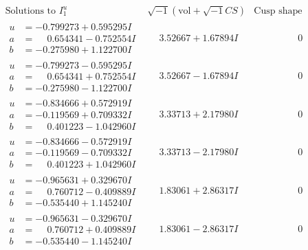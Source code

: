\documentclass[1p]{elsarticle_modified}
\theoremstyle{definition}
\newcommand{\I}{\sqrt{-1}}
\begin{document}
$$\begin{array}{c|c|c}  
\text{Solutions to }I^u_{1}& \I (\text{vol} + \sqrt{-1}CS) & \text{Cusp shape}\\
 \hline 
\begin{aligned}
u &= -0.799273 + 0.595295 I \\
a &= \phantom{-}0.654341 - 0.752554 I \\
b &= -0.275980 + 1.122700 I\end{aligned}
 & \phantom{-}3.52667 + 1.67894 I & \phantom{-0.000000 } 0 \\ \hline\begin{aligned}
u &= -0.799273 - 0.595295 I \\
a &= \phantom{-}0.654341 + 0.752554 I \\
b &= -0.275980 - 1.122700 I\end{aligned}
 & \phantom{-}3.52667 - 1.67894 I & \phantom{-0.000000 } 0 \\ \hline\begin{aligned}
u &= -0.834666 + 0.572919 I \\
a &= -0.119569 + 0.709332 I \\
b &= \phantom{-}0.401223 - 1.042960 I\end{aligned}
 & \phantom{-}3.33713 + 2.17980 I & \phantom{-0.000000 } 0 \\ \hline\begin{aligned}
u &= -0.834666 - 0.572919 I \\
a &= -0.119569 - 0.709332 I \\
b &= \phantom{-}0.401223 + 1.042960 I\end{aligned}
 & \phantom{-}3.33713 - 2.17980 I & \phantom{-0.000000 } 0 \\ \hline\begin{aligned}
u &= -0.965631 + 0.329670 I \\
a &= \phantom{-}0.760712 - 0.409889 I \\
b &= -0.535440 + 1.145240 I\end{aligned}
 & \phantom{-}1.83061 + 2.86317 I & \phantom{-0.000000 } 0 \\ \hline\begin{aligned}
u &= -0.965631 - 0.329670 I \\
a &= \phantom{-}0.760712 + 0.409889 I \\
b &= -0.535440 - 1.145240 I\end{aligned}
 & \phantom{-}1.83061 - 2.86317 I & \phantom{-0.000000 } 0 \\ \hline\begin{aligned}

\end{aligned}
\end{array}$$
\end{document}
